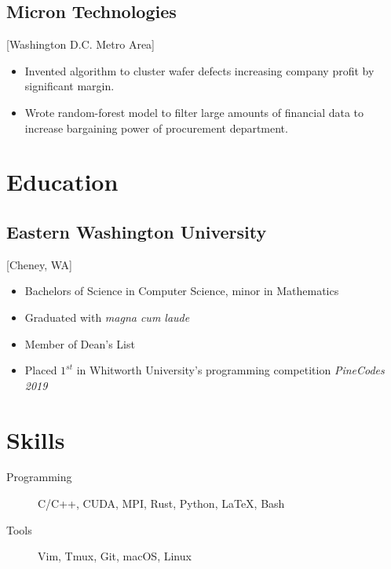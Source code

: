\documentclass{mycv}
\begin{document}
\subsection{Micron Technologies}[Washington D.C. Metro Area]
\begin{positions}
\end{positions}

\begin{itemize}
  \item Invented algorithm to cluster wafer defects increasing company profit by significant margin.
  \item Wrote random-forest model to filter large amounts of financial data to increase bargaining power of procurement department.
\end{itemize}

\section{Education}

\subsection{Eastern Washington University}[Cheney, WA]
\vspace{-\parskip}%
\begin{itemize}[label={}]
  \item Bachelors of Science in Computer Science, minor in Mathematics 
  \item Graduated with \textit{magna cum laude}
  \item Member of Dean's List
  \item Placed $1^{st}$ in Whitworth University's programming competition \textit{PineCodes 2019}
\end{itemize}

\section{Skills}

\begin{description}
  \item[Programming] C/C++, CUDA, MPI, Rust, Python, \LaTeX, Bash
  \item[Tools] Vim, Tmux, Git, macOS, Linux
\end{description}
\end{document}
